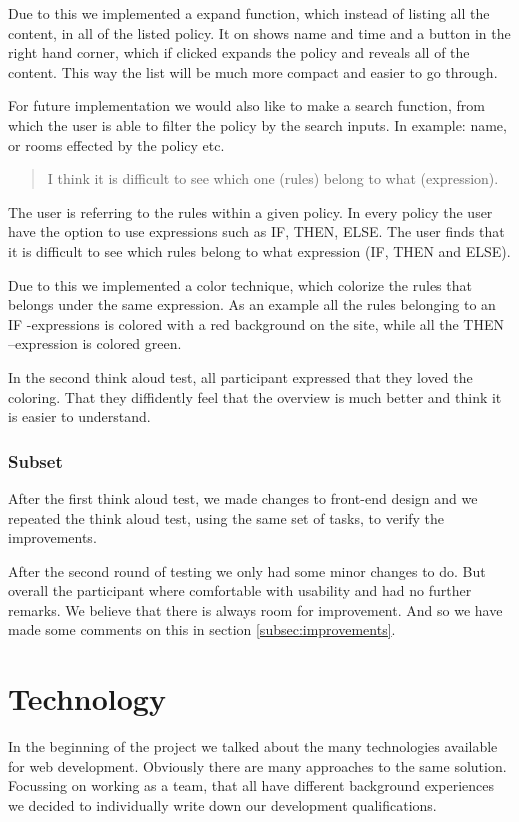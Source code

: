 Due to this we implemented a expand function, which instead of listing all the content, in all of the listed policy. It on shows name and time and a button in the right hand corner, which if clicked expands the policy and reveals all of the content. This way the list will be much more compact and easier to go through. 

For future implementation we would also like to make a search function, from which the user is able to filter the policy by the search inputs. In example: name, or rooms effected  by the policy etc.
 
\begin{quotation}
I think it is difficult to see which one (rules) belong to what (expression).
\end{quotation}

The user is referring to the rules within a given policy. In every policy the user have the option to use expressions such as IF, THEN, ELSE. The user finds that it is difficult to see which rules belong to what expression (IF, THEN and ELSE).

Due to this we implemented a color technique, which colorize the rules that belongs under the same expression. As an example all the rules belonging to an IF -expressions is colored with a red background on the site, while all the THEN –expression is colored green.

In the second think aloud test, all participant expressed that they loved the coloring. That they diffidently feel that the overview is much better and think it is easier to understand.

\subsubsection{Subset}
After the first think aloud test, we made changes to front-end design and we repeated the think aloud test, using the same set of tasks, to verify the improvements. 

After the second round of testing we only had some minor changes to do. But overall the participant where comfortable with usability and had no further remarks.
We believe that there is always room for improvement. And so we have made some comments on this in section \ref{subsec:improvements}.
 


\section{Technology}
In the beginning of the project we talked about the many technologies available for web development. Obviously there are many approaches to the same solution. Focussing on working as a team, that all have different background experiences we decided to individually write down our development qualifications.

